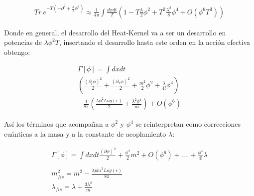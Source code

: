 \begin{equation}
\begin{array}{c}
Tr \  e ^{- T ( - \partial ^2 + \frac{\lambda}{2} \phi ^2 ) } \approx
\frac{1}{4 \pi}
\int
\frac{  dx dt }{T}
\left(
1  -
T  \frac{\lambda}{2} \phi ^2  +
T ^2 \frac{\lambda ^2 }{8} \phi ^4 + O ( \phi ^6 T ^3)
\right)

\end{array}
\end{equation}

Donde en general, el desarrollo del Heat-Kernel va a ser un desarrollo en potencias de $ \lambda \phi ^2 T $, insertando el desarrollo hasta este orden en la acción efectiva obtengo:

\begin{comment}

\begin{equation}
\begin{array}{c}
\int _ { \epsilon } ^{\infty} \frac{ dt}{t} 
e ^{- t m ^2 }
Tr \  e ^{- t ( - \partial ^2 + \frac{\lambda}{2} \phi ^2 ) } = \\
\int _ { \epsilon } ^{1} \frac{ dt}{t} 
e ^{- t m ^2 }
Tr \  e ^{- t ( - \partial ^2 + \frac{\lambda}{2} \phi ^2 ) } + 
\int _ { 1 } ^{\infty} \frac{ dt}{t} 
Tr \  e ^{- t ( - \partial ^2 + m^2 + \frac{\lambda}{2} \phi ^2 ) }

\end{array}
\end{equation}

\end{comment}



\begin{equation}
\begin{array}{c}
\Gamma [ \phi ] = 
\int dx dt  \\
\left(
\frac{( \partial _t \phi ) ^2}{2} +  
\frac{( \partial _x \phi ) ^2}{2} +
\frac{m ^2 }{2} \phi ^2 +
\frac{\lambda}{4!} \phi ^4 
						\right)  \\
- \frac{1}{8 \pi}
\left(
	\frac{\lambda \phi ^2 Log( \epsilon )}{2}  + \frac{ \lambda ^2 \phi ^4 }{m}
	\right) + O ( \phi ^6)

\end{array}
\end{equation}

Así los términos que acompañan a $\phi ^2 $ y $\phi ^4 $ se reinterpretan como correcciones cuánticas a la masa y a la constante de acoplamiento $\lambda $:

\begin{equation}
\begin{array}{c}

\Gamma [ \phi ] = 
\int dx dt 
\frac{ ( \partial \phi ) ^2 }{2 } +
\frac{\phi ^2}{2} m ^2 + O ( \phi ^6 ) + .... 
+ \frac{\phi ^4}{4!} \lambda \\ \\
m ^2 _{fis} = m ^2 - \frac{\lambda phi ^2 Log( \epsilon )}{8 \pi} \\
\lambda _{fis} = \lambda + \frac{3 \lambda ^2}{m} 


\end{array}
\end{equation}

